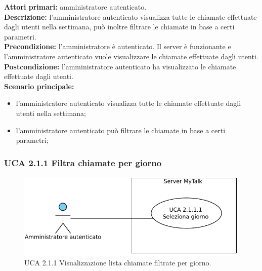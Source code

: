 \noindent
\textbf{Attori primari:} amministratore autenticato.\\
\textbf{Descrizione:} l'amministratore autenticato visualizza tutte le chiamate effettuate dagli utenti nella settimana, può inoltre filtrare le chiamate in base a certi parametri.\\
\textbf{Precondizione:} l'amministratore è autenticato. Il server è funzionante e l'amministratore autenticato vuole visualizzare le chiamate effettuate dagli utenti.\\
\textbf{Postcondizione:} l'amministratore autenticato ha visualizzato le chiamate effettuate dagli utenti.\\
\textbf{Scenario principale:}
\begin{itemize}
\item l'amministratore autenticato visualizza tutte le chiamate effettuate dagli utenti nella settimana;
\item l'amministratore autenticato può filtrare le chiamate in base a certi parametri;
\end{itemize}

\subsubsection{UCA 2.1.1 Filtra chiamate per giorno}

\begin{figure}[htbp]
\centering
\includegraphics[scale=0.7]{./casi_uso/UCA2-1-1.pdf}
\caption{UCA 2.1.1 Visualizzazione lista chiamate filtrate per giorno.}
\end{figure}


